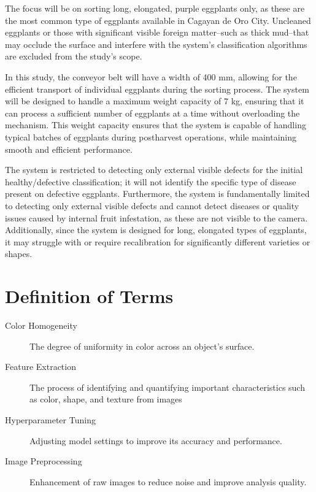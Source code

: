 {The focus will be on sorting long, elongated, purple eggplants only, as these are the most common type of eggplants available in Cagayan de Oro City. Uncleaned  eggplants or those with significant visible foreign matter–such as thick mud–that may occlude the surface and interfere with the system’s classification algorithms are excluded from the study’s scope. 

In this study,  the conveyor belt will have a width of 400 mm, allowing for the efficient transport of individual eggplants during the sorting process. The system will be designed to handle a maximum weight capacity of 7 kg, ensuring that it can process a sufficient number of eggplants at a time without overloading the mechanism. This weight capacity ensures that the system is capable of handling typical batches of eggplants during postharvest operations, while maintaining smooth and efficient performance.

The system is restricted to detecting only external visible defects for the initial healthy/defective classification; it will not identify the specific type of disease present on defective eggplants. Furthermore, the system is fundamentally limited to detecting only external visible defects and cannot detect diseases or quality issues caused by internal fruit infestation, as these are not visible to the camera. Additionally, since the system is designed for long, elongated types of eggplants, it may struggle with or require recalibration for significantly different varieties or shapes.


\section{Definition of Terms}

\begin{description}

	\item[Color Homogeneity] 
	The degree of uniformity in color across an object’s surface.
	
	\item[Feature Extraction] 
	The process of identifying and quantifying important characteristics such as color, shape, and texture from images
	
	\item[Hyperparameter Tuning] 
	Adjusting model settings to improve its accuracy and performance.
	
	\item[Image Preprocessing] 
	Enhancement of raw images to reduce noise and improve analysis quality.
		

\end{description}}
